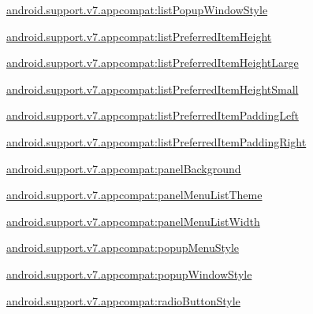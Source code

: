 {\ttfamily \hyperlink{classandroid_1_1support_1_1v7_1_1appcompat_1_1R_1_1styleable_a4a1930d25bde9775ddf86760b943b027}{android.\+support.\+v7.\+appcompat\+:list\+Popup\+Window\+Style}}

{\ttfamily \hyperlink{classandroid_1_1support_1_1v7_1_1appcompat_1_1R_1_1styleable_a491ac1bac5d3e90d2488434571ab909e}{android.\+support.\+v7.\+appcompat\+:list\+Preferred\+Item\+Height}}

{\ttfamily \hyperlink{classandroid_1_1support_1_1v7_1_1appcompat_1_1R_1_1styleable_aeb22f3a67066dc3fc32649e2528521f9}{android.\+support.\+v7.\+appcompat\+:list\+Preferred\+Item\+Height\+Large}}

{\ttfamily \hyperlink{classandroid_1_1support_1_1v7_1_1appcompat_1_1R_1_1styleable_a9c44e92688d2917cbaa6860767dc5c7f}{android.\+support.\+v7.\+appcompat\+:list\+Preferred\+Item\+Height\+Small}}

{\ttfamily \hyperlink{classandroid_1_1support_1_1v7_1_1appcompat_1_1R_1_1styleable_a69a77a880e875071ddde0553b2220450}{android.\+support.\+v7.\+appcompat\+:list\+Preferred\+Item\+Padding\+Left}}

{\ttfamily \hyperlink{classandroid_1_1support_1_1v7_1_1appcompat_1_1R_1_1styleable_a233f7ce58f3391f99dd01b686899d077}{android.\+support.\+v7.\+appcompat\+:list\+Preferred\+Item\+Padding\+Right}}

{\ttfamily \hyperlink{classandroid_1_1support_1_1v7_1_1appcompat_1_1R_1_1styleable_aa555e7cf895108969bdf9dd9d68743be}{android.\+support.\+v7.\+appcompat\+:panel\+Background}}

{\ttfamily \hyperlink{classandroid_1_1support_1_1v7_1_1appcompat_1_1R_1_1styleable_abe4dcb478c5a3aa191bd3e7faf51f323}{android.\+support.\+v7.\+appcompat\+:panel\+Menu\+List\+Theme}}

{\ttfamily \hyperlink{classandroid_1_1support_1_1v7_1_1appcompat_1_1R_1_1styleable_a6f48a7a199f63c3e2f95ae393ff66aeb}{android.\+support.\+v7.\+appcompat\+:panel\+Menu\+List\+Width}}

{\ttfamily \hyperlink{classandroid_1_1support_1_1v7_1_1appcompat_1_1R_1_1styleable_a6b864691ad3dd51a0c728b5e6b9cc7f5}{android.\+support.\+v7.\+appcompat\+:popup\+Menu\+Style}}

{\ttfamily \hyperlink{classandroid_1_1support_1_1v7_1_1appcompat_1_1R_1_1styleable_ab49e956338c41cad14a71489cf3e3ad1}{android.\+support.\+v7.\+appcompat\+:popup\+Window\+Style}}

{\ttfamily \hyperlink{classandroid_1_1support_1_1v7_1_1appcompat_1_1R_1_1styleable_a32deb732b0bc3a329b727aef8b0c20d7}{android.\+support.\+v7.\+appcompat\+:radio\+Button\+Style}}


